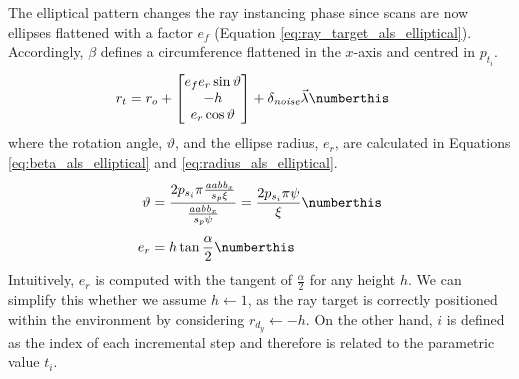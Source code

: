 The elliptical pattern changes the ray instancing phase since scans are now ellipses flattened with a factor $e_{f}$ (Equation \ref{eq:ray_target_als_elliptical}). Accordingly, $\beta$ defines a circumference flattened in the $x$-axis and centred in $p_{t_{i}}$. 
\begin{align*}
    r_{t} &= r_{o} + 
    \begin{bmatrix}e_{f} e_{r} \sin{\vartheta}\\ -h\\ e_{r} \cos{\vartheta}\end{bmatrix} + \delta_{\textit{noise}} \vec{\lambda}
    \numberthis \label{eq:ray_target_als_elliptical}
\end{align*}
where the rotation angle, $\vartheta$, and the ellipse radius, $e_{r}$, are calculated in Equations \ref{eq:beta_als_elliptical} and \ref{eq:radius_als_elliptical}.
\begin{align*}
    \vartheta &= \frac{2 p_{s_{i}} \pi \frac{\textit{aabb}_{x}}{s_{p} \xi}}{\frac{\textit{aabb}_{x}}{s_{p} \psi}} = \frac{2 p_{s_{i}} \pi \psi}{\xi} 
    \numberthis \label{eq:beta_als_elliptical}\\[0.4em]
    e_{r} &= h \tan{\frac{\alpha}{2}}  
    \numberthis \label{eq:radius_als_elliptical}
\end{align*}
Intuitively, $e_{r}$ is computed with the tangent of $\frac{\alpha}{2}$ for any height $h$. We can simplify this whether we assume $h \gets 1$, as the ray target is correctly positioned within the environment by considering $r_{d_{y}} \gets -h$. On the other hand, $i$ is defined as the index of each incremental step and therefore is related to the parametric value $t_{i}$.

